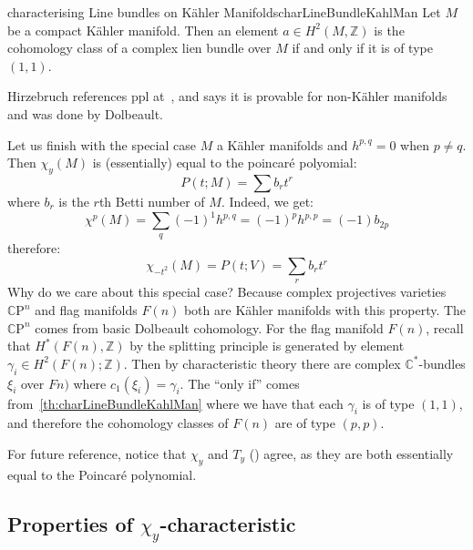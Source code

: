 \documentclass{book}
\newcommand{\C}{{\mathbb{C}}}
\newcommand{\Z}{{\mathbb{Z}}}
\newcommand{\CP}{\mathbb{C}\mathrm{P}}
\begin{document}
\begin{thm}{characterising Line bundles on K\"ahler Manifolds}{charLineBundleKahlMan}
  Let $M$ be a compact K\"ahler manifold. Then an element $a \in H^2(M, \Z)$ is the cohomology class of
  a complex lien bundle over $M$ if and only if it is of type $(1,1)$.
\end{thm}

\begin{Proof}
  Hirzebruch references ppl at~\cite[p.127, Thm~15.9.1]{hirzebruchTopologicalMethodsAlgebraic1995}, and
  says it is provable for non-K\"ahler manifolds and was done by Dolbeault.
\end{Proof}


Let us finish with the special case $M$ a K\"ahler manifolds and $h^{p,q} = 0$ when $p\ne q$. Then $\chi_y(M)$
is (essentially) equal to the poincar\'e polyomial:
\[
  P(t; M) = \sum b_rt^r
\]
where $b_r$ is the $r$th Betti number of $M$. Indeed, we get:
\[
  \chi^p(M) = \sum_q (-1)^1 h^{p,q} = (-1)^p h^{p,p} = (-1)b_{2p}
\]
therefore:
\[
  \chi_{-t^2}(M) = P(t;V) = \sum_r b_rt^r
\]
Why do we care about this special case? Because complex projectives varieties $\CP^n$ and flag manifolds
$F(n)$ both are K\"ahler manifolds with this property. The $\CP^n$ comes from basic Dolbeault cohomology. For
the flag manifold $F(n)$, recall that $H^*(F(n), \Z)$ by the splitting principle is generated by element
$\gamma_i \in H^2(F(n); \Z)$. Then by characteristic theory there are complex $\C^*$-bundles $\xi_i$ over
$Fn)$ where $c_1(\xi_i) = \gamma_i$. The ``only if'' comes from~\cref{th:charLineBundleKahlMan} where we have
that each $\gamma_i$ is of type $(1,1)$, and therefore the cohomology classes of $F(n)$ are of type $(p,p)$.

For future reference, notice that $\chi_y$ and $T_y$ (\cite[14.4]{hirzebruchTopologicalMethodsAlgebraic1995})
agree, as they are both essentially equal to the Poincar\'e polynomial.


\subsection{Properties of $\chi_y$-characteristic}\label{sec:propGenerlizedEulerChar}
\end{document}
